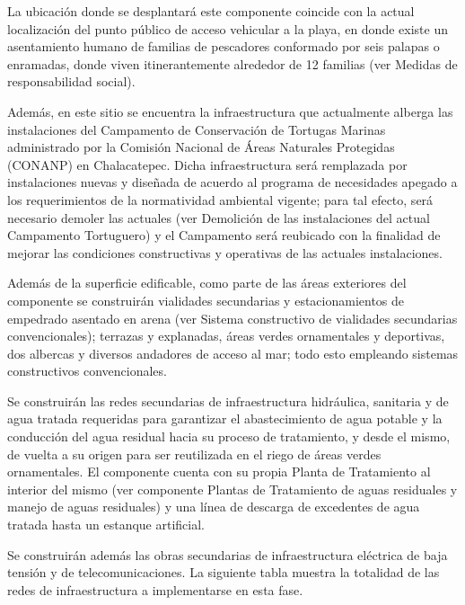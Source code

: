 \documentclass[twoside]{article}
\begin{document}
\begin{multicols}{2}
La ubicación donde se desplantará este componente coincide con la actual localización del punto público de acceso vehicular a la playa, en donde existe un asentamiento humano de familias de pescadores conformado por seis palapas o enramadas, donde viven itinerantemente alrededor de 12 familias (ver Medidas de responsabilidad social). 

Además, en este sitio se encuentra la infraestructura que actualmente alberga las instalaciones del Campamento de Conservación de Tortugas Marinas administrado por la Comisión Nacional de Áreas Naturales Protegidas (CONANP) en Chalacatepec. Dicha infraestructura será remplazada por instalaciones nuevas y diseñada de acuerdo al programa de necesidades apegado a los requerimientos de la normatividad ambiental vigente; para tal efecto, será necesario demoler las actuales (ver Demolición de las instalaciones del actual Campamento Tortuguero) y el Campamento será reubicado con la finalidad de mejorar las condiciones constructivas y operativas de las actuales instalaciones. 

Además de la superficie edificable, como parte de las áreas exteriores del componente se construirán vialidades secundarias y estacionamientos de empedrado asentado en arena (ver Sistema constructivo de vialidades secundarias convencionales); terrazas y explanadas, áreas verdes ornamentales y deportivas, dos albercas y diversos andadores de acceso al mar; todo esto empleando sistemas constructivos convencionales. 

Se construirán las redes secundarias de infraestructura hidráulica, sanitaria y de agua tratada requeridas para garantizar el abastecimiento de agua potable y la conducción del agua residual hacia su proceso de tratamiento, y desde el mismo, de vuelta a su origen para ser reutilizada en el riego de áreas verdes ornamentales. El componente cuenta con su propia Planta de Tratamiento al interior del mismo (ver componente Plantas de Tratamiento de aguas residuales y manejo de aguas residuales) y una línea de descarga de excedentes de agua tratada hasta un estanque artificial.

Se construirán además las obras secundarias de infraestructura eléctrica de baja tensión y de telecomunicaciones. La siguiente tabla muestra la totalidad de las redes de infraestructura a implementarse en esta fase.

\bigskip


\end{multicols}
\end{document}
